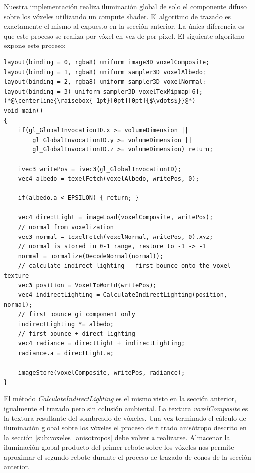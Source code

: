 Nuestra implementación realiza iluminación global de solo el componente difuso sobre los vóxeles utilizando un compute shader. El algoritmo de trazado es exactamente el mismo al expuesto en la sección anterior. La única diferencia es que este proceso se realiza por vóxel en vez de por pixel. El siguiente algoritmo expone este proceso:
\\
\begin{lstlisting}[caption={Iluminacion global sobre voxeles.}, label=Trace7]
layout(binding = 0, rgba8) uniform image3D voxelComposite;
layout(binding = 1, rgba8) uniform sampler3D voxelAlbedo;
layout(binding = 2, rgba8) uniform sampler3D voxelNormal;
layout(binding = 3) uniform sampler3D voxelTexMipmap[6];
(*@\centerline{\raisebox{-1pt}[0pt][0pt]{$\vdots$}}@*)
void main()
{
    if(gl_GlobalInvocationID.x >= volumeDimension ||
        gl_GlobalInvocationID.y >= volumeDimension ||
        gl_GlobalInvocationID.z >= volumeDimension) return;

    ivec3 writePos = ivec3(gl_GlobalInvocationID);
    vec4 albedo = texelFetch(voxelAlbedo, writePos, 0);

    if(albedo.a < EPSILON) { return; }

    vec4 directLight = imageLoad(voxelComposite, writePos);
    // normal from voxelization
    vec3 normal = texelFetch(voxelNormal, writePos, 0).xyz;
    // normal is stored in 0-1 range, restore to -1 -> -1
    normal = normalize(DecodeNormal(normal));
    // calculate indirect lighting - first bounce onto the voxel texture
    vec3 position = VoxelToWorld(writePos);
    vec4 indirectLighting = CalculateIndirectLighting(position, normal);
    // first bounce gi component only
    indirectLighting *= albedo;
    // first bounce + direct lighting
    vec4 radiance = directLight + indirectLighting;
    radiance.a = directLight.a;

    imageStore(voxelComposite, writePos, radiance);
}
\end{lstlisting}
El método \emph{CalculateIndirectLighting} es el mismo visto en la sección anterior, igualmente el trazado pero sin oclusión ambiental. La textura \emph{voxelComposite} es la textura resultante del sombreado de vóxeles. Una vez terminado el cálculo de iluminación global sobre los vóxeles el proceso de filtrado anisótropo descrito en la sección \ref{sub:voxeles_anisotropos} debe volver a realizarse. Almacenar la iluminación global producto del primer rebote sobre los vóxeles nos permite aproximar el segundo rebote durante el proceso de trazado de conos de la sección anterior.
